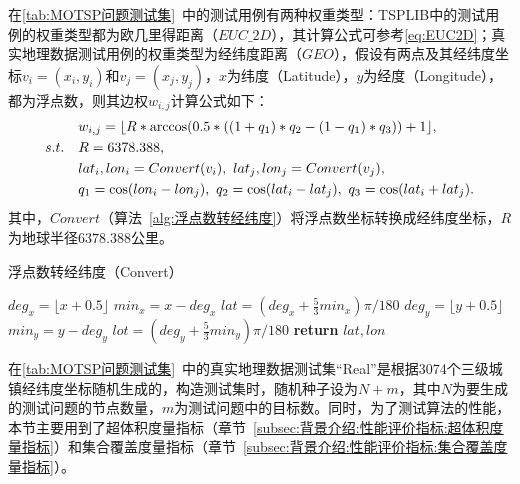 在\autoref{tab:MOTSP问题测试集}~中的测试用例有两种权重类型：TSPLIB中的测试用例的权重类型都为欧几里得距离（$EUC\_2D$），其计算公式可参考\autoref{eq:EUC2D}；真实地理数据测试用例的权重类型为经纬度距离（$GEO$），假设有两点及其经纬度坐标$v_i = (x_i, y_i)$和$v_j = (x_j, y_j)$，$x$为纬度（Latitude），$y$为经度（Longitude），都为浮点数，则其边权$w_{i,j}$计算公式如下：
\vspace{-1em}
\begin{align}
    \label{eq:GEO}
    & w_{i,j} =\lfloor R * \arccos(0.5*((1+q_1)*q_2 - (1-q_1)*q_3)) + 1 \rfloor, \\
    s.t. \quad & R = 6378.388, \notag  \\
    & lat_i, lon_i = Convert(v_i), \ lat_j, lon_j = Convert(v_j), \notag \\
    & q_1 = \cos(lon_i - lon_j), \  q_2 = \cos(lat_i - lat_j), \ q_3 = \cos(lat_i + lat_j). \notag
\end{align}
其中，$Convert$（算法~\ref{alg:浮点数转经纬度}）将浮点数坐标转换成经纬度坐标，$R$为地球半径$6378.388$公里。
\begin{algorithm}[!h]
    \caption{浮点数转经纬度（Convert）}
    \label{alg:浮点数转经纬度}
    \BlankLine
    $deg_x = \lfloor x + 0.5 \rfloor$ \;
    $min_x = x - deg_x$ \;
    $lat = (deg_x + \frac{5}{3}min_x)\pi/180$ \;
    $deg_y = \lfloor y + 0.5 \rfloor$ \;
    $min_y = y - deg_y$ \;
    $lot = (deg_y + \frac{5}{3}min_y)\pi/180$ \;
    \textbf{return } $lat, lon$ \;
\end{algorithm}
\par
在\autoref{tab:MOTSP问题测试集}~中的真实地理数据测试集“Real”是根据3074个三级城镇经纬度坐标随机生成的，构造测试集时，随机种子设为$N+m$，其中$N$为要生成的测试问题的节点数量，$m$为测试问题中的目标数。同时，为了测试算法的性能，本节主要用到了超体积度量指标（章节~\ref{subsec:背景介绍:性能评价指标:超体积度量指标}）和集合覆盖度量指标（章节~\ref{subsec:背景介绍:性能评价指标:集合覆盖度量指标}）。

